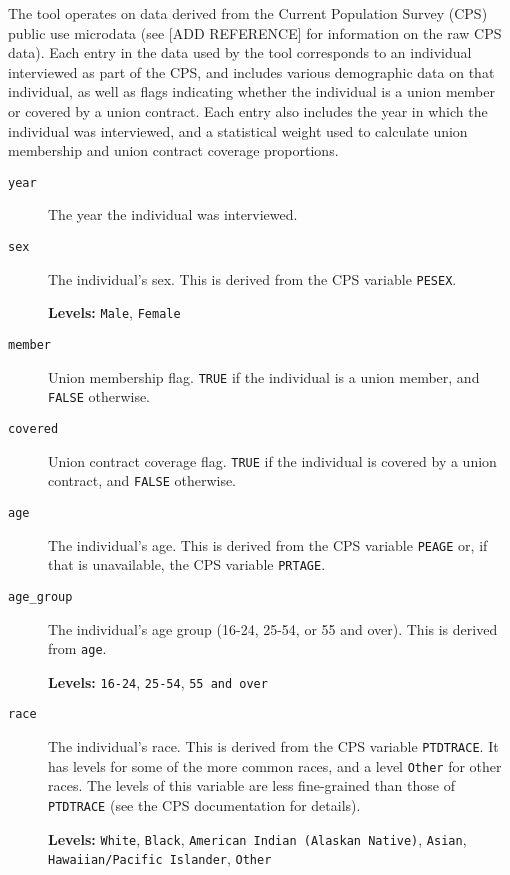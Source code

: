 \documentclass[letterpaper,12pt]{article}
\begin{document}
The tool operates on data derived from the Current Population Survey (CPS) public use microdata 
(see [ADD REFERENCE] for information on the raw CPS data). Each entry in the data used by the tool 
corresponds to an individual interviewed as part of the CPS, and includes various demographic data 
on that individual, as well as flags indicating whether the individual is a union member or covered 
by a union contract. Each entry also includes the year in which the individual was interviewed, and 
a statistical weight used to calculate union membership and union contract coverage proportions.
\begin{description}
\item[\texttt{year}]
The year the individual was interviewed.

\item[\texttt{sex}]
The individual's sex. This is derived from the CPS variable \texttt{PESEX}.

\textbf{Levels:} \texttt{Male}, \texttt{Female}

\item[\texttt{member}]
Union membership flag. \texttt{TRUE} if the individual is a union member, and \texttt{FALSE} 
otherwise.

\item[\texttt{covered}]
Union contract coverage flag. \texttt{TRUE} if the individual is covered by a union contract, and 
\texttt{FALSE} otherwise.

\item[\texttt{age}]
The individual's age. This is derived from the CPS variable \texttt{PEAGE} or, if that 
is unavailable, the CPS variable \texttt{PRTAGE}.

\item[\texttt{age\_group}]
The individual's age group (16-24, 25-54, or 55 and over). This is derived from \texttt{age}.

\textbf{Levels:} \texttt{16-24}, \texttt{25-54}, \texttt{55 and over}

\item[\texttt{race}]
The individual's race. This is derived from the CPS variable \texttt{PTDTRACE}. It has levels for 
some of the more common races, and a level \texttt{Other} for other races. The levels of this 
variable are less fine-grained than those of \texttt{PTDTRACE} (see the CPS documentation for 
details).

\textbf{Levels:} \texttt{White}, \texttt{Black}, \texttt{American Indian (Alaskan Native)}, 
\texttt{Asian}, \texttt{Hawaiian/Pacific Islander}, \texttt{Other}


\end{description}
\end{document}
